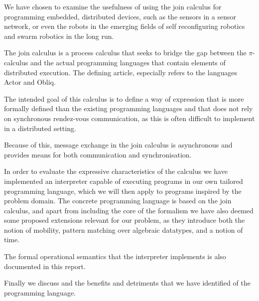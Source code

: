 
We have chosen to examine the usefulness of using the join calculus for
programming embedded, distributed devices, such as the sensors in a sensor
network, or even the robots in the emerging fields of self reconfiguring
robotics and swarm robotics in the long run.

The join calculus is a process calculus that seeks to bridge the gap between the
$\pi$-calculus and the actual programming languages that contain elements of
distributed execution. The defining article, \cite{fournet1996reflexive}
especially refers to the languages Actor and Obliq.

The intended goal of this calculus is to define a way of expression that is more
formally defined than the existing programming languages and that does not rely
on synchronous rendez-vous communication, as this is often difficult to
implement in a distributed setting.

Because of this, message exchange in the join calculus is asynchronous and
provides means for both communication and synchronisation.

In order to evaluate the expressive characteristics of the calculus we have
implemented an interpreter capable of executing programs in our own tailored
programming language, which we will then apply to programs inspired by the
problem domain.  The concrete programming language is based on the join
calculus, and apart from including the core of the formalism we have also deemed
some proposed extensions relevant for our problem, as they introduce both the
notion of mobility, pattern matching over algebraic datatypes, and a notion of
time.

The formal operational semantics that the interpreter implements is also
documented in this report.

Finally we discuss  and the benefits and detriments that we have identified of the
programming language.
